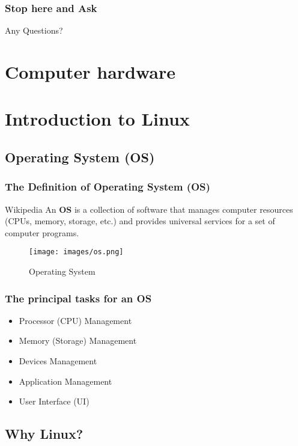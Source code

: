 \documentclass[red]{beamer}
\begin{document}
\begin{CJK*}{GBK}{kai}
\begin{frame}
\frametitle{Stop here and Ask}
\begin{center}
\Huge Any Questions?
\end{center}
\end{frame}

\section[Hardware]{Computer hardware}



\section[Linux Overview]{Introduction to Linux}

\subsection{Operating System (OS)}
\begin{frame}
\frametitle{The Definition of Operating System (OS)}
\begin{block}{Wikipedia}
An \textbf{OS} is a collection of software that manages computer resources 
(CPUs, memory, storage, etc.) and provides universal services for a set of 
computer programs.
\end{block}
\begin{center}
\begin{figure}
  \texttt{[image: images/os.png]}\\
  \caption{Operating System}
  \label{fig1}
\end{figure}
\end{center}
\end{frame}

\begin{frame}
\frametitle{The principal tasks for an OS}
\begin{itemize}
    \item Processor (CPU) Management
    \item Memory (Storage) Management
    \item Devices Management
    \item Application Management
    \item User Interface (UI)
\end{itemize}
\end{frame}

\subsection{Why Linux?}


\end{CJK*}
\end{document}
